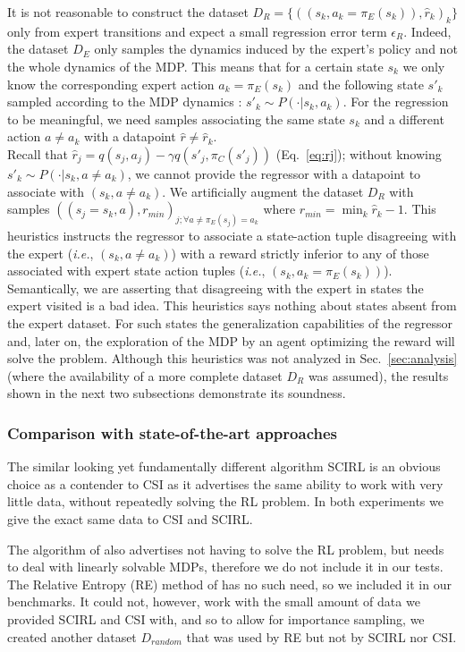 \documentclass{llncs}
\begin{document}
It is not reasonable to construct the dataset $D_R = \{((s_k,a_k=\pi_E(s_k)),\hat r_k)_k\}$ only from expert transitions and expect a small regression error term $\epsilon_R$. Indeed, the dataset $D_E$ only samples the dynamics induced by the expert's policy and not the whole dynamics of the MDP.
This means that for a certain state $s_k$ we only know the corresponding expert action $a_k=\pi_E(s_k)$ and the following state $s'_k$ sampled according to the MDP dynamics : $s'_k \sim P(\cdot|s_k,a_k)$. For the regression to be meaningful, we need samples associating the same state $s_k$ and a different action $a\neq a_k$ with a datapoint $\hat r \neq \hat r_k$.\\
Recall that $\hat r_j = q(s_j,a_j) - \gamma q(s'_j,\pi_C(s'_j))$ (Eq.~\eqref{eq:rj}); without knowing $s'_k \sim P(\cdot|s_k,a\neq a_k)$, we cannot provide the regressor with a datapoint to associate with $(s_k,a\neq a_k)$.
We artificially augment the dataset $D_R$ with samples $((s_j=s_k,a),r_{min})_{j;\forall a\neq \pi_E(s_j) = a_k}$ where
$  r_{min} = \min_k\hat r_k - 1$.
This heuristics instructs the regressor to associate a state-action tuple disagreeing with the expert ({\it i.e.}, $(s_k,a\neq a_k)$) with a reward strictly inferior to any of those associated with expert state action tuples ({\it i.e.}, $(s_k,a_k=\pi_E(s_k))$). Semantically, we are asserting that disagreeing with the expert in states the expert visited is a bad idea. This heuristics says nothing about states absent from the expert dataset. For such states the generalization capabilities of the regressor and, later on, the exploration of the MDP by an agent optimizing the reward will solve the problem.
Although this heuristics was not analyzed in Sec.~\ref{sec:analysis} (where the availability of a more complete dataset $D_R$ was assumed), the results shown in the next two subsections demonstrate its soundness.
\subsubsection{Comparison with state-of-the-art approaches}
The similar looking yet fundamentally different algorithm SCIRL \cite{klein2012scirl} is an obvious choice as a contender to CSI as it advertises the same ability to work with very little data, without repeatedly solving the RL problem. In both experiments we give the exact same data to CSI and SCIRL.

The algorithm of \cite{dvijotham2010inverse} also advertises not having to solve the RL problem, but needs to deal with linearly solvable MDPs, therefore we do not include it in our tests. The Relative Entropy (RE) method of \cite{boularias2011relative} has no such need, so we included it in our benchmarks. It could not, however, work with the small amount of data we provided SCIRL and CSI with, and so to allow for importance sampling, we created another dataset $D_{random}$ that was used by RE but not by SCIRL nor CSI.
\end{document}
